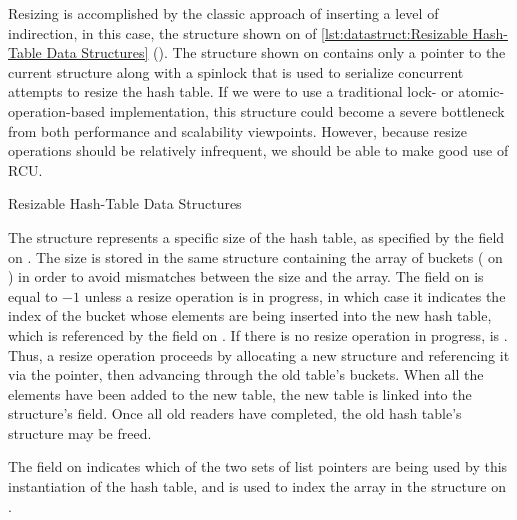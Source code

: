 \begin{fcvref}
Resizing is accomplished by the classic approach of inserting a level
of indirection, in this case, the  structure shown on
 of
\cref{lst:datastruct:Resizable Hash-Table Data Structures}
().
The  structure shown on
 contains only a
pointer to the current  structure along with a spinlock that
is used to serialize concurrent attempts to resize the hash table.
If we were to use a traditional lock- or atomic-operation-based
implementation, this  structure could become a severe bottleneck
from both performance and scalability viewpoints.
However, because resize operations should be relatively infrequent,
we should be able to make good use of RCU\@.

\begin{listing}

\caption{Resizable Hash-Table Data Structures}
\label{lst:datastruct:Resizable Hash-Table Data Structures}
\end{listing}

The  structure represents a specific size of the hash table,
as specified by the  field on .
The size is stored in the same structure containing the array of
buckets ( on
) in order to avoid mismatches between
the size and the array.
The  field on
 is equal to $-1$ unless a resize
operation
is in progress, in which case it indicates the index of the bucket whose
elements are being inserted into the new hash table, which is referenced
by the  field on .
If there is no resize operation in progress,  is .
Thus, a resize operation proceeds by allocating a new  structure
and referencing it via the  pointer, then advancing
 through the old table's buckets.
When all the elements have been added to the new table, the new
table is linked into the  structure's  field.
Once all old readers have completed, the old hash table's  structure
may be freed.

The  field on
 indicates which of the two sets of
list pointers are being used by this instantiation of the hash table,
and is used to index the  array in the 
structure on .


\end{fcvref}
